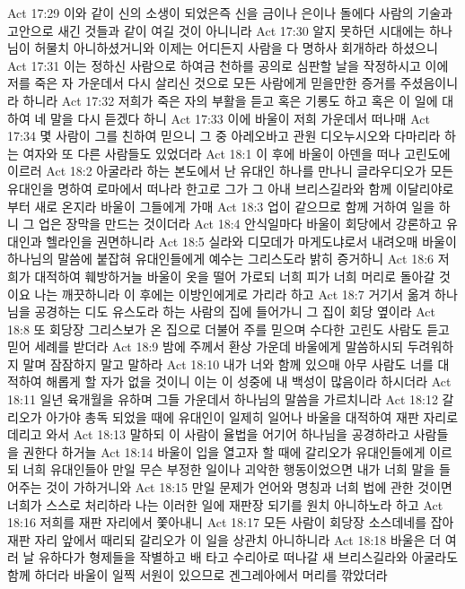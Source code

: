 Act 17:29  이와 같이 신의 소생이 되었은즉 신을 금이나 은이나 돌에다 사람의 기술과 고안으로 새긴 것들과 같이 여길 것이 아니니라
Act 17:30  알지 못하던 시대에는 하나님이 허물치 아니하셨거니와 이제는 어디든지 사람을 다 명하사 회개하라 하셨으니
Act 17:31  이는 정하신 사람으로 하여금 천하를 공의로 심판할 날을 작정하시고 이에 저를 죽은 자 가운데서 다시 살리신 것으로 모든 사람에게 믿을만한 증거를 주셨음이니라 하니라
Act 17:32  저희가 죽은 자의 부활을 듣고 혹은 기롱도 하고 혹은 이 일에 대하여 네 말을 다시 듣겠다 하니
Act 17:33  이에 바울이 저희 가운데서 떠나매
Act 17:34  몇 사람이 그를 친하여 믿으니 그 중 아레오바고 관원 디오누시오와 다마리라 하는 여자와 또 다른 사람들도 있었더라
Act 18:1  이 후에 바울이 아덴을 떠나 고린도에 이르러
Act 18:2  아굴라라 하는 본도에서 난 유대인 하나를 만나니 글라우디오가 모든 유대인을 명하여 로마에서 떠나라 한고로 그가 그 아내 브리스길라와 함께 이달리야로부터 새로 온지라 바울이 그들에게 가매
Act 18:3  업이 같으므로 함께 거하여 일을 하니 그 업은 장막을 만드는 것이더라
Act 18:4  안식일마다 바울이 회당에서 강론하고 유대인과 헬라인을 권면하니라
Act 18:5  실라와 디모데가 마게도냐로서 내려오매 바울이 하나님의 말씀에 붙잡혀 유대인들에게 예수는 그리스도라 밝히 증거하니
Act 18:6  저희가 대적하여 훼방하거늘 바울이 옷을 떨어 가로되 너희 피가 너희 머리로 돌아갈 것이요 나는 깨끗하니라 이 후에는 이방인에게로 가리라 하고
Act 18:7  거기서 옮겨 하나님을 공경하는 디도 유스도라 하는 사람의 집에 들어가니 그 집이 회당 옆이라
Act 18:8  또 회당장 그리스보가 온 집으로 더불어 주를 믿으며 수다한 고린도 사람도 듣고 믿어 세례를 받더라
Act 18:9  밤에 주께서 환상 가운데 바울에게 말씀하시되 두려워하지 말며 잠잠하지 말고 말하라
Act 18:10  내가 너와 함께 있으매 아무 사람도 너를 대적하여 해롭게 할 자가 없을 것이니 이는 이 성중에 내 백성이 많음이라 하시더라
Act 18:11  일년 육개월을 유하며 그들 가운데서 하나님의 말씀을 가르치니라
Act 18:12  갈리오가 아가야 총독 되었을 때에 유대인이 일제히 일어나 바울을 대적하여 재판 자리로 데리고 와서
Act 18:13  말하되 이 사람이 율법을 어기어 하나님을 공경하라고 사람들을 권한다 하거늘
Act 18:14  바울이 입을 열고자 할 때에 갈리오가 유대인들에게 이르되 너희 유대인들아 만일 무슨 부정한 일이나 괴악한 행동이었으면 내가 너희 말을 들어주는 것이 가하거니와
Act 18:15  만일 문제가 언어와 명칭과 너희 법에 관한 것이면 너희가 스스로 처리하라 나는 이러한 일에 재판장 되기를 원치 아니하노라 하고
Act 18:16  저희를 재판 자리에서 쫓아내니
Act 18:17  모든 사람이 회당장 소스데네를 잡아 재판 자리 앞에서 때리되 갈리오가 이 일을 상관치 아니하니라
Act 18:18  바울은 더 여러 날 유하다가 형제들을 작별하고 배 타고 수리아로 떠나갈 새 브리스길라와 아굴라도 함께 하더라 바울이 일찍 서원이 있으므로 겐그레아에서 머리를 깎았더라
